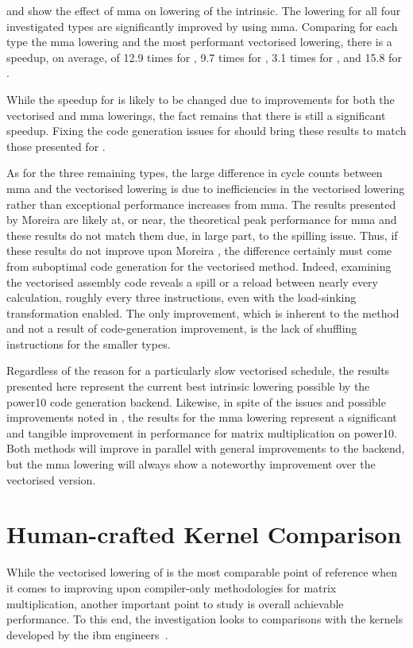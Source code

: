 \documentclass[\main/thesis.tex]{subfiles}
\begin{document}
 and  show the effect of \gls{mma} on \gls{lowering} of the  intrinsic.
The \gls{lowering} for all four investigated types are significantly improved by using \gls{mma}.
Comparing for each type the \gls{mma} \gls{lowering} and the most performant vectorised \gls{lowering}, there is a speedup, on average, of 12.9 times for , 9.7 times for , 3.1 times for , and 15.8 for .

While the speedup for  is likely to be changed due to improvements for both the vectorised and \gls{mma} \glspl{lowering}, the fact remains that there is still a significant speedup.
Fixing the code generation issues for  should bring these results to match those presented for .

As for the three remaining types, the large difference in cycle counts between \gls{mma} and the vectorised \gls{lowering} is due to inefficiencies in the vectorised \gls{lowering} rather than exceptional performance increases from \gls{mma}.
The results presented by Moreira \etal are likely at, or near, the theoretical peak performance for \gls{mma} and these results do not match them due, in large part, to the spilling issue.
Thus, if these results do not improve upon Moreira \etal, the difference certainly must come from suboptimal code generation for the vectorised method.
Indeed, examining the vectorised  assembly code reveals a spill or a reload between nearly every calculation, roughly every three instructions, even with the load-sinking transformation enabled.
The only improvement, which is inherent to the method and not a result of code-generation improvement, is the lack of shuffling instructions for the smaller types.

Regardless of the reason for a particularly slow vectorised schedule, the results presented here represent the current best intrinsic \gls{lowering} possible by the \gls{power10} code generation backend.
Likewise, in spite of the issues and possible improvements noted in , the results for the \gls{mma} \gls{lowering} represent a significant and tangible improvement in performance for matrix multiplication on \gls{power10}.
Both methods will improve in parallel with general improvements to the backend, but the \gls{mma} \gls{lowering} will always show a noteworthy improvement over the vectorised version.

\section{Human-crafted Kernel Comparison}
While the vectorised \gls{lowering} of  is the most comparable point of reference when it comes to improving upon compiler-only methodologies for matrix multiplication, another important point to study is overall achievable performance.
To this end, the investigation looks to comparisons with the kernels developed by the \gls{ibm} engineers~\autocite{moreira2021matrix}.
\end{document}
